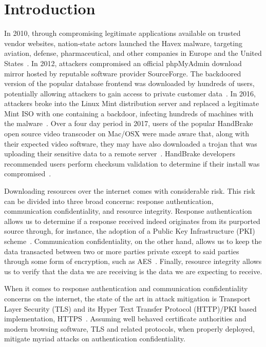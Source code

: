 \section{Introduction} \label{sec:introduction}

In 2010, through compromising legitimate applications available on trusted
vendor websites, nation-state actors launched the Havex malware, targeting
aviation, defense, pharmaceutical, and other companies in Europe and the United
States~\cite{SCA-HAVEX1, SCA-HAVEX2}. In 2012, attackers compromised an official
phpMyAdmin download mirror hosted by reputable software provider SourceForge.
The backdoored version of the popular database frontend was downloaded by
hundreds of users, potentially allowing attackers to gain access to private
customer data~\cite{SCA-PMA1, SCA-PMA2}. In 2016, attackers broke into the Linux
Mint distribution server and replaced a legitimate Mint ISO with one containing
a backdoor, infecting hundreds of machines with the malware~\cite{SCA-MINT1,
SCA-MINT2}. Over a four day period in 2017, users of the popular HandBrake open
source video transcoder on Mac/OSX were made aware that, along with their
expected video software, they may have also downloaded a trojan that was
uploading their sensitive data to a remote server~\cite{SCA-HB1}. HandBrake
developers recommended users perform checksum validation to determine if their
install was compromised~\cite{SCA-HB2}.

Downloading resources over the internet comes with considerable risk. This risk
can be divided into three broad concerns: response authentication, communication
confidentiality, and resource integrity. Response authentication allows us to
determine if a response received indeed originates from its purported source
through, for instance, the adoption of a Public Key Infrastructure (PKI)
scheme~\cite{PKI}. Communication confidentiality, on the other hand, allows us
to keep the data transacted between two or more parties private except to said
parties through some form of encryption, such as AES~\cite{AES}. Finally,
resource integrity allows us to verify that the data we are receiving is the
data we are expecting to receive.

When it comes to response authentication and communication confidentiality
concerns on the internet, the state of the art in attack mitigation is Transport
Layer Security (TLS) and its Hyper Text Transfer Protocol (HTTP)/PKI based
implementation, HTTPS~\cite{TLS1.2, TLS1, TLS0, HTTPS, PKI}. Assuming well
behaved certificate authorities and modern browsing software, TLS and related
protocols, when properly deployed, mitigate myriad attacks on authentication
confidentiality.

